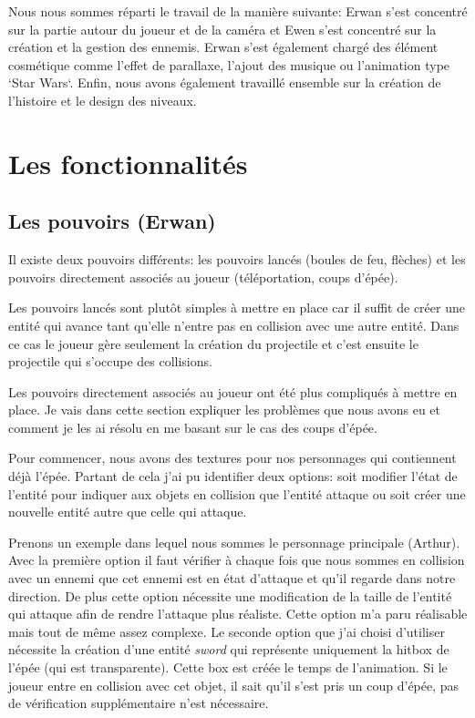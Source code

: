 \documentclass{article}
\begin{document}
Nous nous sommes réparti le travail de la manière suivante:
Erwan s'est concentré sur la partie autour du joueur et de la caméra et Ewen s'est concentré sur la création et
la gestion des ennemis.
Erwan s'est également chargé des élément cosmétique comme l'effet de parallaxe, l'ajout des musique ou 
l'animation type `Star Wars`.
Enfin, nous avons également travaillé ensemble sur la création de l'histoire et le design des niveaux.

\section{Les fonctionnalités}

\subsection{Les pouvoirs (Erwan)}

Il existe deux pouvoirs différents: les pouvoirs lancés (boules de feu, flèches) et les pouvoirs 
directement associés au joueur (téléportation, coups d'épée).

Les pouvoirs lancés sont plutôt simples à mettre en place car il suffit de créer une 
entité qui avance tant qu'elle n'entre pas en collision avec une autre entité. Dans ce cas le joueur 
gère seulement la création du projectile et c'est ensuite le projectile qui s'occupe des collisions.

Les pouvoirs directement associés au joueur ont été plus compliqués à mettre en place. Je vais 
dans cette section expliquer les problèmes que nous avons eu et comment je les ai résolu en me basant 
sur le cas des coups d'épée.

Pour commencer, nous avons des textures pour nos personnages qui contiennent déjà l'épée. Partant de cela
j'ai pu identifier deux options: soit modifier l'état de l'entité pour indiquer aux objets en collision 
que l'entité attaque ou soit créer une nouvelle entité autre que celle qui attaque.

Prenons un exemple dans lequel nous sommes le personnage principale (Arthur). Avec la première option il 
faut vérifier à chaque fois que nous sommes en collision avec un ennemi que cet ennemi est en état d'attaque 
et qu'il regarde dans notre direction. De plus cette option nécessite une modification de la taille de 
l'entité qui attaque afin de rendre l'attaque plus réaliste. Cette option m'a paru réalisable mais tout de 
même assez complexe. Le seconde option que j'ai choisi d'utiliser nécessite la création d'une entité 
\textit{sword} qui représente uniquement la hitbox de l'épée (qui est transparente). Cette box est créée 
le temps de l'animation. Si le joueur entre en collision avec cet objet, il sait qu'il s'est pris un 
coup d'épée, pas de vérification supplémentaire n'est nécessaire.
\end{document}

